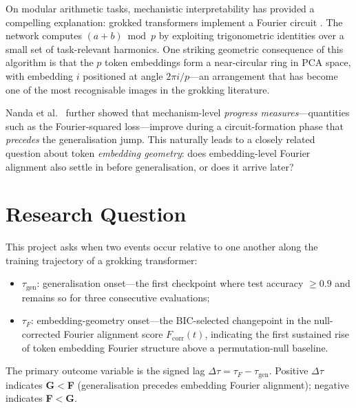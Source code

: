 \documentclass[12pt,openany,a4paper]{book}
\newcommand{\taug}{\tau_{\mathrm{gen}}}
\newcommand{\tauf}{\tau_{F}}
\newcommand{\Dtau}{\Delta\tau}
\newcommand{\fcorr}{F_{\mathrm{corr}}}
\begin{document}
On modular arithmetic tasks, mechanistic interpretability
\cite{olah2020circuits} has provided a compelling explanation:
grokked transformers implement a Fourier circuit
\cite{nanda2023progress}.
The network computes $(a+b)\bmod p$ by exploiting trigonometric
identities over a small set of task-relevant harmonics.
One striking geometric consequence of this algorithm is that the $p$ token embeddings form a near-circular ring in PCA space, with embedding $i$ positioned at angle $2\pi i/p$---an arrangement that has become one of the most recognisable images in the grokking literature.

Nanda et al.\ \cite{nanda2023progress} further showed that mechanism-level
\emph{progress measures}---quantities such as the Fourier-squared
loss---improve during a circuit-formation phase that \emph{precedes}
the generalisation jump.
This naturally leads to a closely related question about token \emph{embedding geometry}: does embedding-level Fourier alignment also settle in before generalisation, or does it arrive later?

\section{Research Question}

This project asks when two events occur relative to one another along the training trajectory of a grokking transformer:
\begin{itemize}
  \item $\taug$: generalisation onset---the first checkpoint where test
    accuracy $\geq 0.9$ and remains so for three consecutive evaluations;
  \item $\tauf$: embedding-geometry onset---the BIC-selected changepoint
    in the null-corrected Fourier alignment score $\fcorr(t)$, indicating
    the first sustained rise of token embedding Fourier structure above
    a permutation-null baseline.
\end{itemize}
The primary outcome variable is the signed lag $\Dtau = \tauf - \taug$.
Positive $\Dtau$ indicates \textbf{G$<$F} (generalisation precedes
embedding Fourier alignment); negative indicates \textbf{F$<$G}.
\end{document}
